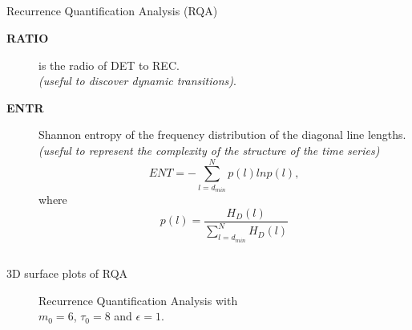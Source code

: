 \subsection{}
{

\begin{frame}{Recurrence Quantification Analysis (RQA)}

\begin{description}
\item [ \textbf{RATIO} ] is the radio of DET to REC. \\
			\textit{(useful to discover dynamic transitions)}.
\item [ \textbf{ENTR} ] Shannon entropy of the frequency distribution of the 
			diagonal line lengths.
			\textit{(useful to represent the complexity of the 
				structure of the time series)}
\begin{equation*}
	ENT= - \sum^{N}_{l=d_{min}} p(l) ln p(l),
\end{equation*}
where 
\begin{equation*}
	p(l)=\frac{ H_D(l) }{ \sum^{N}_{ l=d_{min} } H_D(l) }
\end{equation*}

\end{description}


	
\end{frame}
}




\subsection{}
{

\begin{frame}{3D surface plots of RQA}

    \begin{figure}
	\caption{Recurrence Quantification Analysis with \\
		$m_0=6$, $\tau_0=8$ and $\epsilon=1$.
		} 
   \end{figure}
		
\end{frame}
}







